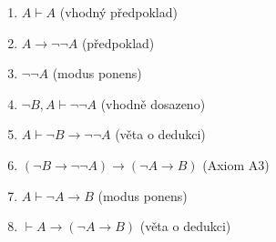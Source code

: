 \begin{enumerate}[1)]
  \item $A \vdash A$ (vhodný předpoklad)
  \item $A \rightarrow \neg \neg A$ (předpoklad)
  \item $\neg \neg A$ (modus ponens)
  \item $\neg B, A \vdash \neg \neg A $ (vhodně dosazeno)
  \item $A \vdash \neg B \rightarrow \neg \neg A$ (věta o dedukci)
  \item $(\neg B \rightarrow \neg \neg A) \rightarrow (\neg A \rightarrow B)$ (Axiom A3)
  \item $A \vdash \neg A \rightarrow B$ (modus ponens)
  \item $\vdash A \rightarrow (\neg A \rightarrow B)$ (věta o dedukci)
\end{enumerate}
